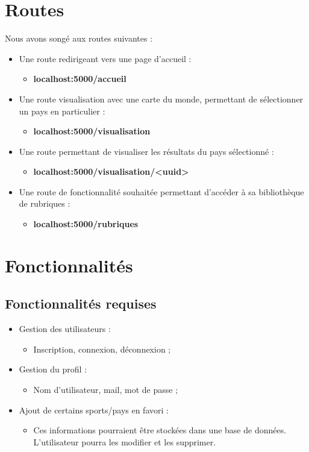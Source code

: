 \documentclass[12pt]{article}
\begin{document}
	\section{Routes}
	
	Nous avons songé aux routes suivantes :
	
	\begin{itemize}
		\item Une route redirigeant vers une page d'accueil :
		\begin{itemize}
			\item \textbf{localhost:5000/accueil}
		\end{itemize}
		\item Une route visualisation avec une carte du monde, permettant de sélectionner un pays en particulier :
		\begin{itemize}
			\item \textbf{localhost:5000/visualisation}
		\end{itemize}
		\item Une route permettant de visualiser les résultats du pays sélectionné :
		\begin{itemize}
			\item \textbf{localhost:5000/visualisation/<uuid>}
		\end{itemize}
		\item Une route de fonctionnalité souhaitée permettant d'accéder à sa bibliothèque de rubriques :
		\begin{itemize}
			\item \textbf{localhost:5000/rubriques}
		\end{itemize}
	\end{itemize}

	\section{Fonctionnalités}
	
	\subsection{Fonctionnalités requises}
	
	\begin{itemize}
		\item Gestion des utilisateurs :
		\begin{itemize}
			\item Inscription, connexion, déconnexion ;
		\end{itemize}
		\item Gestion du profil :
		\begin{itemize}
			\item Nom d'utilisateur, mail, mot de passe ;
		\end{itemize}
		\item Ajout de certains sports/pays en favori :
		\begin{itemize}
			\item Ces informations pourraient être stockées dans une base de données. L'utilisateur pourra les modifier et les supprimer.
		\end{itemize}
	\end{itemize}
\end{document}
